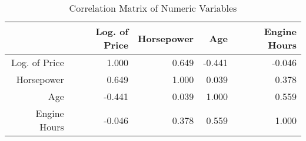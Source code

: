\begin{table}[ht]
\centering
\begin{tabular}{rrrrr}
  \hline
 & Log. of Price & Horsepower & Age & Engine Hours \\ 
  \hline
Log. of Price & 1.000 & 0.649 & -0.441 & -0.046 \\ 
  Horsepower & 0.649 & 1.000 & 0.039 & 0.378 \\ 
  Age & -0.441 & 0.039 & 1.000 & 0.559 \\ 
  Engine Hours & -0.046 & 0.378 & 0.559 & 1.000 \\ 
   \hline
\end{tabular}
\caption{Correlation Matrix of Numeric Variables} 
\label{tab:correlation}
\end{table}
